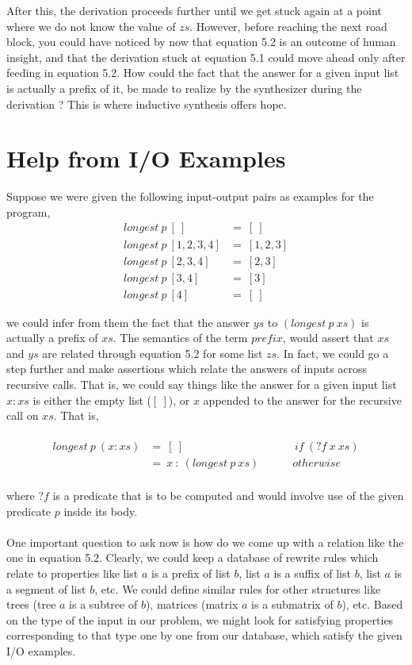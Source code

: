 \noindent
After this, the derivation proceeds further until we get stuck again at a point where we do not know the value of $zs$. However, before reaching the next road block, you could have noticed by now that equation 5.2 is an outcome of human insight, and that the derivation stuck at equation 5.1 could move ahead only after feeding in equation 5.2. How could the fact that the answer for a given input list is actually a prefix of it, be made to realize by the synthesizer during the derivation ? This is where inductive synthesis offers hope.

\section{Help from I/O Examples}
Suppose we were given the following input-output pairs as examples for the program, \\
\begin{align*}
longest\: p\: [\:] &=\: [\:] \\
longest\: p\: [1,2,3,4] &=\: [1,2,3] \\
longest\: p\: [2,3,4] &=\: [2,3] \\
longest\: p\: [3,4] &=\: [3] \\
longest\: p\: [4] &=\: [\:]
\end{align*}

\noindent
we could infer from them the fact that the answer $ys$ to $(longest\: p\: xs)$ is actually a prefix of $xs$. The semantics of the term $prefix$, would assert that $xs$ and $ys$ are related through equation 5.2 for some list $zs$. In fact, we could go a step further and make assertions which relate the answers of inputs across recursive calls. That is, we could say things like the answer for a given input list $x:xs$ is either the empty list ($[\:]$), or $x$ appended to the answer for the recursive call on $xs$. That is, \\\\
\begin{equation}
\begin{split}
longest\: p\: (x:xs) &= \: [\:]\qquad \qquad \qquad \qquad \qquad  if\: (?f\: x\: xs) \\
&=\: x\: :\: (longest\: p\: xs)\qquad \quad otherwise
\end{split}
\end{equation}\\

\noindent
where $?f$ is a predicate that is to be computed and would involve use of the given predicate $p$ inside its body. \\\\
One important question to ask now is how do we come up with a relation like the one in equation 5.2. Clearly, we could keep a database of rewrite rules which relate to properties like list $a$ is a prefix of list $b$, list $a$ is a suffix of list $b$, list $a$ is a segment of list $b$, etc. We could define similar rules for other structures like trees (tree $a$ is a subtree of $b$), matrices (matrix $a$ is a submatrix of $b$), etc. Based on the type of the input in our problem, we might look for satisfying properties corresponding to that type one by one from our database, which satisfy the given I/O examples.

